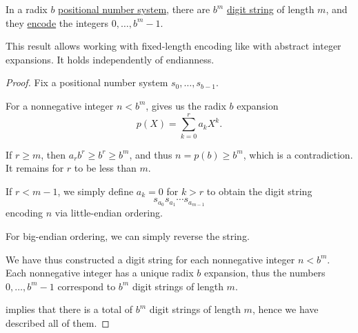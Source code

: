 \begin{proposition}\label{thm:def:fixed_length_nonnegative_integer_encoding}
  In a radix \( b \) \hyperref[def:positional_number_system]{positional number system}, there are \( b^m \) \hyperref[def:positional_number_system]{digit string} of length \( m \), and they \hyperref[def:fixed_length_nonnegative_integer_encoding]{encode} the integers \( 0, \ldots, b^m - 1 \).
\end{proposition}
\begin{comments}
  \item This result allows working with fixed-length encoding like with abstract integer expansions. It holds independently of endianness.
\end{comments}
\begin{proof}
  Fix a positional number system \( s_0, \ldots, s_{b-1} \).

  For a nonnegative integer \( n < b^m \),  gives us the radix \( b \) expansion
  \begin{equation*}
    p(X) = \sum_{k=0}^r a_k X^k.
  \end{equation*}

  If \( r \geq m \), then \( a_r b^r \geq b^r \geq b^m \), and thus \( n = p(b) \geq b^m \), which is a contradiction. It remains for \( r \) to be less than \( m \).

  If \( r < m - 1 \), we simply define \( a_k = 0 \) for \( k > r \) to obtain the digit string
  \begin{equation*}
    s_{a_0} s_{a_1} \cdots s_{a_{m-1}}
  \end{equation*}
  encoding \( n \) via little-endian ordering.

  For big-endian ordering, we can simply reverse the string.

  We have thus constructed a digit string for each nonnegative integer \( n < b^m \). Each nonnegative integer has a unique radix \( b \) expansion, thus the numbers \( 0, \ldots, b^m - 1 \) correspond to \( b^m \) digit strings of length \( m \).

   implies that there is a total of \( b^m \) digit strings of length \( m \), hence we have described all of them.
\end{proof}

